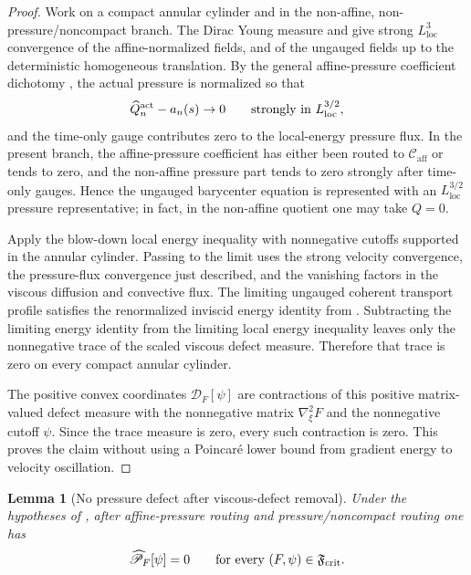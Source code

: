 \documentclass[11pt]{amsart}
\numberwithin{equation}{section}
\theoremstyle{plain}
\newtheorem{lemma}[lemma]{Lemma}
\theoremstyle{definition}
\theoremstyle{remark}
\newcommand{\loc}{\mathrm{loc}}
\newcommand{\Caff}{\mathcal C_{\mathrm{aff}}}
\begin{document}
\begin{proof}
Work on a compact annular cylinder and in the non-affine, non-pressure/noncompact
branch.  The Dirac Young measure and
give strong \(L^3_{\loc}\) convergence of the affine-normalized fields, and of
the ungauged fields up to the deterministic homogeneous translation.  By the
general affine-pressure coefficient dichotomy
, the actual pressure is
normalized so that
\[
   \widehat Q_n^{\rm act}-a_n(s)\to0
   \qquad\text{strongly in }L^{3/2}_{\loc},
\]
and the time-only gauge contributes zero to the local-energy pressure flux.
In the present branch, the affine-pressure coefficient has either been routed to
\(\Caff\) or tends to zero, and the non-affine pressure part tends to zero
strongly after time-only gauges.  Hence the ungauged barycenter equation is
represented with an \(L^{3/2}_{\loc}\) pressure representative; in fact, in the
non-affine quotient one may take \(Q=0\).

Apply the blow-down local energy inequality
 with nonnegative cutoffs supported in the
annular cylinder.  Passing to the limit uses the strong velocity convergence,
the pressure-flux convergence just described, and the vanishing factors in the
viscous diffusion and convective flux.  The limiting ungauged coherent transport
profile satisfies the renormalized inviscid energy identity from
.  Subtracting the limiting energy
identity from the limiting local energy inequality leaves only the nonnegative
trace of the scaled viscous defect measure.  Therefore that trace is zero on
every compact annular cylinder.

The positive convex coordinates \(\mathscr D_F[\psi]\) are contractions of this
positive matrix-valued defect measure with the nonnegative matrix
\(\nabla^2_\xi F\) and the nonnegative cutoff \(\psi\).  Since the trace measure
is zero, every such contraction is zero.  This proves the claim without using a
Poincar\'e lower bound from gradient energy to velocity oscillation.
\end{proof}

\begin{lemma}[No pressure defect after viscous-defect removal]
\label{lem:no-pressure-defect-tight-dirac}
Under the hypotheses of
, after affine-pressure routing and
pressure/noncompact routing one has
\[
   \widehat{\mathscr P}_F[\psi]=0
   \qquad\text{for every }(F,\psi)\in\mathfrak F_{\rm crit}.
\]
\end{lemma}
\end{document}
